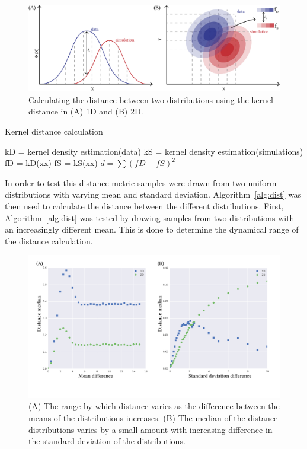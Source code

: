 \begin{figure}[tb]
\centering
\includegraphics[scale=0.8]{../../chapters/chapterABCFlow/images/old_distance.png}
\caption[Kernel distance]{\label{fig:old_dist}Calculating the distance between two distributions using the kernel distance in (A) 1D and (B) 2D. }
\end{figure}



\begin{algorithm}[tb]
\caption{Kernel distance calculation}
\label{alg:dist}
 \begin{algorithmic}[1]
    \Statex
	\State kD = kernel density estimation(data)
	\State kS = kernel density estimation(simulations)
	\State fD = kD(xx)
	\State fS = kS(xx)    
	\State $d = \sum(fD-fS)^2$
  \end{algorithmic}
\end{algorithm}

In order to test this distance metric samples were drawn from two uniform distributions with varying mean and standard deviation. Algorithm~\ref{alg:dist} was then used to calculate the distance between the different distributions. First, Algorithm~\ref{alg:dist} was tested by drawing samples from two distributions with an increasingly different mean. This is done to determine the dynamical range of the distance calculation.

\begin{figure}[htb]
\centering
\includegraphics[scale=0.7]{../../chapters/chapterABCFlow/images/mus_sigmas-01.png}
\caption[Range of distance values using the kernel distance]{\label{fig:epsilon_mu_s_diff}(A) The range by which distance varies as the difference between the means of the distributions increases. (B) The median of the distance distributions varies by a small amount with increasing difference in the standard deviation of the distributions.}
\end{figure}

